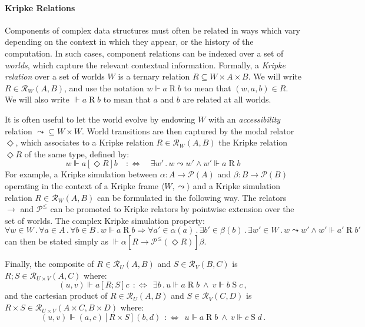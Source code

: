 \documentclass[acmsmall,screen,review,anonymous]{acmart}
\newcommand{\ifr}[1]{\mathrel{[{#1}]}}
\begin{document}
\paragraph{Kripke Relations}

Components of complex data structures
must often be related in ways which vary
depending on the context in which they appear,
or the history of the computation.
In such cases,
component relations can be indexed over a set of \emph{worlds},
which capture the relevant contextual information.
Formally, a \emph{Kripke relation} over a set of worlds $W$
is a ternary relation $R \subseteq W \times A \times B$.
We will write $R \in \mathcal{R}_W(A, B)$,
and use the notation
$
  w \Vdash a \mathrel{R} b
$
to mean that $(w, a, b) \in R$.
We will also write
$\Vdash a \mathrel{R} b$
to mean that $a$ and $b$ are related at all worlds.

It is often useful to let the world evolve
by endowing $W$ with an \emph{accessibility} relation
${\leadsto} \subseteq W \times W$.
World transitions are then captured by the modal relator $\Diamond$,
which associates to a Kripke relation $R \in \mathcal{R}_W(A, B)$
the Kripke relation $\Diamond R$ of the same type, defined by:
\[
  w \Vdash a \ifr{\Diamond R} b
  \quad:\Leftrightarrow\quad
  \exists w' \mathbin. w \leadsto w' \wedge w' \Vdash a \mathrel{R} b
\]
For example,
a Kripke simulation between $\alpha : A \rightarrow \mathcal{P}(A)$
and $\beta : B \rightarrow \mathcal{P}(B)$
operating in the context of a Kripke frame $\langle W, {\leadsto} \rangle$
and a Kripke simulation relation $R \in \mathcal{R}_W(A, B)$
can be formulated in the following way.
The relators $\rightarrow$ and $\mathcal{P}^\le$
can be promoted to Kripke relators
by pointwise extension over the set of worlds.
The complex Kripke simulation property:
{\small
\[
  \forall w \in W \mathbin.
  \forall a \in A \mathbin.
  \forall b \in B \mathbin.
  w \Vdash a \mathrel{R} b \Rightarrow
  \forall a' \in \alpha(a) \mathbin.
  \exists b' \in \beta(b) \mathbin.
  \exists w' \in W \mathbin.
  w \leadsto w' \wedge w' \Vdash a' \mathrel{R} b'
\]
}
can then be stated simply as
$
  \Vdash \alpha \ifr{R \rightarrow \mathcal{P}^\le(\Diamond R)} \beta
$.

Finally,
the composite of
$R \in \mathcal{R}_U(A, B)$ and $S \in \mathcal{R}_V(B, C)$
is $R \mathbin; S \in \mathcal{R}_{U \times V}(A, C)$ where:
\[
  (u, v) \Vdash a \mathrel{[R \mathbin; S]} c \:\::\Leftrightarrow\:\:
  \exists b \mathbin.
    u \Vdash a \mathrel{R} b \:\wedge\: v \Vdash b \mathrel{S} c
  \,,
\]
and the cartesian product of $R \in \mathcal{R}_U(A, B)$ and
$S \in \mathcal{R}_V(C, D)$
is ${R \times S} \in \mathcal{R}_{U \times V}(A \times C, B \times D)$ where:
\[
  (u, v) \Vdash (a, c) \mathrel{[R \times S]} (b, d) \:\::\Leftrightarrow\:\:
  u \Vdash a \mathrel{R} b \:\wedge\: v \Vdash c \mathrel{S} d
  \,.
\]
\end{document}
